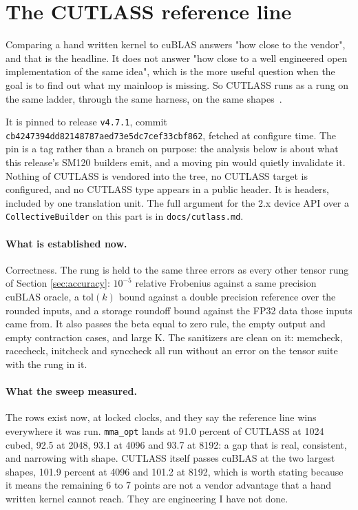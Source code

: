 \section{The CUTLASS reference line}
\label{sec:cutlass}

Comparing a hand written kernel to cuBLAS answers "how close to the vendor", and
that is the headline. It does not answer "how close to a well engineered open
implementation of the same idea", which is the more useful question when the goal
is to find out what my mainloop is missing. So CUTLASS runs as a rung on the same
ladder, through the same harness, on the same shapes~\cite{cutlass}.

It is pinned to release \texttt{v4.7.1}, commit
\texttt{cb4247394dd82148787aed73e5dc7cef33cbf862}, fetched at configure time. The
pin is a tag rather than a branch on purpose: the analysis below is about what
this release's SM120 builders emit, and a moving pin would quietly invalidate it.
Nothing of CUTLASS is vendored into the tree, no CUTLASS target is configured, and
no CUTLASS type appears in a public header. It is headers, included by one
translation unit. The full argument for the 2.x device API over a
\texttt{CollectiveBuilder} on this part is in \texttt{docs/cutlass.md}.

\paragraph{What is established now.} Correctness. The rung is held to the same
three errors as every other tensor rung of Section \ref{sec:accuracy}: $10^{-5}$
relative Frobenius against a same precision cuBLAS oracle, a $\text{tol}(k)$ bound
against a double precision reference over the rounded inputs, and a storage
roundoff bound against the FP32 data those inputs came from. It also passes the
beta equal to zero rule, the empty output and empty contraction cases, and large
K. The sanitizers are clean on it: memcheck, racecheck, initcheck and synccheck
all run without an error on the tensor suite with the rung in it.

\paragraph{What the sweep measured.} The rows exist now, at locked clocks, and
they say the reference line wins everywhere it was run. \texttt{mma\_opt} lands at
91.0 percent of CUTLASS at 1024 cubed, 92.5 at 2048, 93.1 at 4096 and 93.7 at 8192:
a gap that is real, consistent, and narrowing with shape. CUTLASS itself passes
cuBLAS at the two largest shapes, 101.9 percent at 4096 and 101.2 at 8192, which is
worth stating because it means the remaining 6 to 7 points are not a vendor
advantage that a hand written kernel cannot reach. They are engineering I have not
done.

